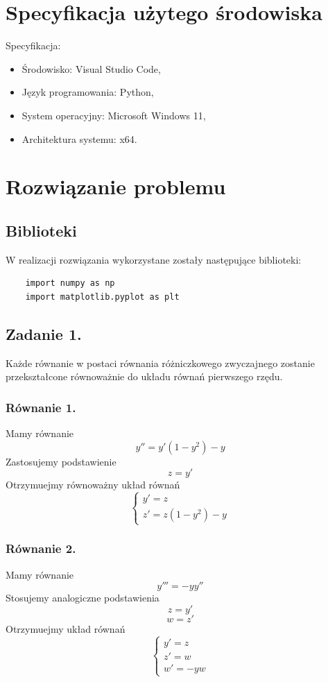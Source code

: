 \documentclass[11pt, leqno]{scrartcl}
\begin{document}
    \section{Specyfikacja użytego środowiska}
    Specyfikacja:
    \begin{itemize}
        \item Środowisko: Visual Studio Code,
        \item Język programowania: Python,
        \item System operacyjny: Microsoft Windows 11,
        \item Architektura systemu: x64.
    \end{itemize}

    \section{Rozwiązanie problemu}
    \subsection{Biblioteki}
    W realizacji rozwiązania wykorzystane zostały następujące
    biblioteki:
    \begin{lstlisting}
    import numpy as np
    import matplotlib.pyplot as plt
    \end{lstlisting}

    \subsection{Zadanie 1.}
    Każde równanie w postaci równania różniczkowego zwyczajnego
    zostanie przekształcone równoważnie do układu równań
    pierwszego rzędu.

    \subsubsection{Równanie 1.}
    Mamy równanie
    \[
        y''=y'(1-y^2)-y
    \]
    Zastosujemy podstawienie
    \[
        z=y'
    \]
    Otrzymuejmy równoważny układ równań
    \[
        \begin{cases}
            y'=z \\
            z'=z(1-y^2)-y
        \end{cases}
    \]

    \subsubsection{Równanie 2.}
    Mamy równanie
    \[
        y'''=-yy''
    \]
    Stosujemy analogiczne podstawienia
    \[
        z=y'
    \]
    \[
        w=z'
    \]
    Otrzymuejmy układ równań
    \[
        \begin{cases}
            y'=z \\
            z'=w \\
            w'=-yw
        \end{cases}
    \]
\end{document}
